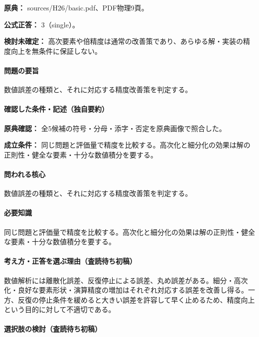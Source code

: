 \noindent\textbf{原典：} sources/H26/basic.pdf、PDF物理9頁。

\textbf{公式正答：} 3（single）。

\par\textbf{検討未確定：} 高次要素や倍精度は通常の改善策であり、あらゆる解・実装の精度向上を無条件に保証しない。

\paragraph{問題の要旨} 数値誤差の種類と、それに対応する精度改善策を判定する。

\paragraph{確認した条件・記述（独自要約）}\mbox{}\par

\noindent\textbf{原典確認：} 全5候補の符号・分母・添字・否定を原典画像で照合した。\par

\noindent\textbf{成立条件：} 同じ問題と評価量で精度を比較する。高次化と細分化の効果は解の正則性・健全な要素・十分な数値積分を要する。\par

\paragraph{問われる核心} 数値誤差の種類と、それに対応する精度改善策を判定する。

\paragraph{必要知識} 同じ問題と評価量で精度を比較する。高次化と細分化の効果は解の正則性・健全な要素・十分な数値積分を要する。

\paragraph{考え方・正答を選ぶ理由（査読待ち初稿）} 数値解析には離散化誤差、反復停止による誤差、丸め誤差がある。細分・高次化・良好な要素形状・演算精度の増加はそれぞれ対応する誤差を改善し得る。一方、反復の停止条件を緩めると大きい誤差を許容して早く止めるため、精度向上という目的に対して不適切である。

\paragraph{選択肢の検討（査読待ち初稿）}\mbox{}\par


